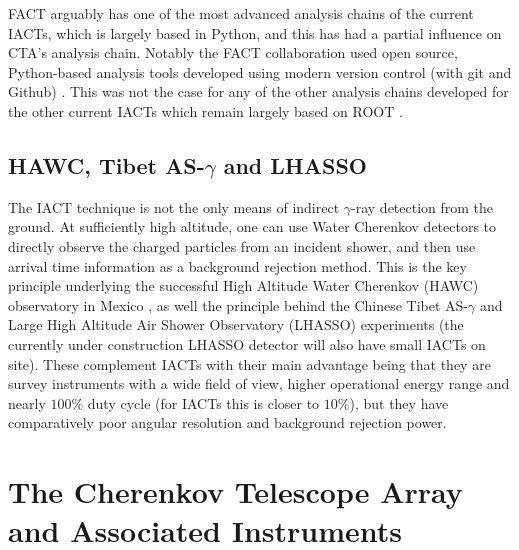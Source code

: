 FACT arguably has one of the most advanced analysis chains of the current IACTs, which is largely based in Python, and this has had a partial influence on CTA's analysis chain. Notably the FACT collaboration used open source, Python-based analysis tools developed using modern version control (with git and Github) \cite{factspec}. This was not the case for any of the other analysis chains developed for the other current IACTs which remain largely based on ROOT \cite{root}.

\subsection{HAWC, Tibet AS-\ensuremath{\gamma} and LHASSO}

The IACT technique is not the only means of indirect $\gamma$-ray detection from the ground. At sufficiently high altitude, one can use Water Cherenkov detectors to directly observe the charged particles from an incident shower, and then use arrival time information as a background rejection method. This is the key principle underlying the successful High Altitude Water Cherenkov (HAWC) observatory in Mexico \cite{hawc}, as well the principle behind the Chinese Tibet AS-$\gamma$ \cite{asgamma} and Large High Altitude Air Shower Observatory (LHASSO) \cite{lhassocrab} experiments (the currently under construction LHASSO detector will also have small IACTs on site). These complement IACTs with their main advantage being that they are survey instruments with a wide field of view, higher operational energy range and nearly $100\%$ duty cycle (for IACTs this is closer to $10\%$), but they have comparatively poor angular resolution and background rejection power. 

\section{The Cherenkov Telescope Array and Associated Instruments}
